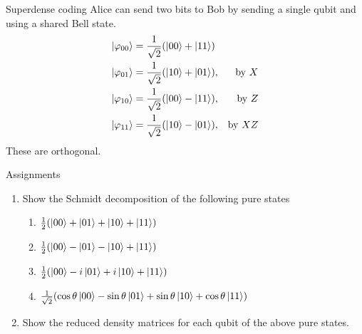 \documentclass[10pt]{beamer}
\newcommand\emm[1]{\textcolor{redorange}{{#1}}}
\begin{document}
\begin{frame}{Superdense coding}
Alice can send \emm{two} bits to Bob by sending a single qubit and using a shared Bell state.
\begin{align*}
\ket{\varphi_{00}} &= \frac1{\sqrt{2}}(\ket{00}+\ket{11})\\
\ket{\varphi_{01}} &= \frac1{\sqrt{2}}(\ket{10}+\ket{01}),& \text{by $X$}\\
\ket{\varphi_{10}} &= \frac1{\sqrt{2}}(\ket{00}-\ket{11}),& \text{by $Z$}\\
\ket{\varphi_{11}} &= \frac1{\sqrt{2}}(\ket{10}-\ket{01}),& \text{by $XZ$}\\
\end{align*}
These are \emm{orthogonal}.
\end{frame}
\fi



\begin{frame}{Assignments}
\begin{enumerate}
\setlength{\itemsep}{2em}
\item Show the Schmidt decomposition of the following pure states
\begin{enumerate}[A]
\setlength{\itemsep}{1em}
\item $\frac12(\ket{00}+\ket{01}+\ket{10}+\ket{11})$
\item $\frac12(\ket{00}-\ket{01}-\ket{10}+\ket{11})$
\item $\frac12(\ket{00}-i\ket{01}+i\ket{10}+\ket{11})$
\item $\frac1{\sqrt2}(\cos\theta\ket{00}-\sin\theta\ket{01}+\sin\theta\ket{10}+\cos\theta\ket{11})$
\end{enumerate}
\item Show the reduced density matrices for each qubit of the above pure states.
\end{enumerate}
\end{frame}
\end{document}
